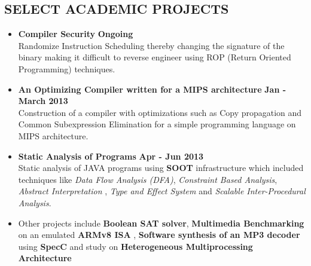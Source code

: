 \documentclass{system}
\begin{document}
\begin{resume}
\section {SELECT ACADEMIC PROJECTS}
\hrulefill
 \begin{itemize} \itemsep 2pt
 \item {\bfseries Compiler Security } \hfill {\bfseries Ongoing} \\
 Randomize Instruction Scheduling thereby changing the signature of the binary
 making it difficult to reverse engineer using ROP (Return Oriented
 Programming) techniques.
 \item {\bfseries An Optimizing Compiler written for a MIPS architecture}
 \hfill {\bfseries Jan - March 2013} \\
 Construction of a compiler with optimizations such as Copy propagation and Common Subexpression
 Elimination for a simple programming language on
 MIPS architecture.
 \item {\bfseries Static Analysis of Programs} \hfill {\bfseries Apr - Jun
 2013} \\
 Static analysis of JAVA programs using {\bfseries SOOT} infrastructure which included
 techniques like {\it Data Flow Analysis (DFA)}, {\it Constraint
 Based Analysis}, {\it Abstract Interpretation} , { \it Type and
 Effect System} and {\it Scalable Inter-Procedural Analysis}.
 \item Other projects include {\bfseries Boolean SAT solver}, {\bfseries
 Multimedia Benchmarking} on an
 emulated {\bfseries ARMv8 ISA} , {\bfseries Software synthesis of an MP3
 decoder} using {\bfseries SpecC} and study
 on {\bfseries Heterogeneous Multiprocessing Architecture} 

 \end{itemize}

 
 
\end{resume} 
\end{document}
